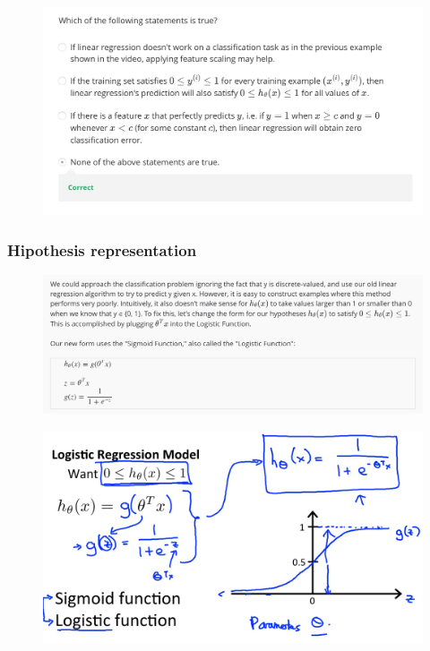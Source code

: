 \documentclass[12pt, A4,onecolumn]{article} %
\begin{document}
\begin{figure}[H]
	\centering
	\includegraphics[width=1\textwidth]{./Imagenes/testClass}
\end{figure}
\newpage
\subsubsection{Hipothesis representation}
\begin{figure}[H]
	\centering
	\includegraphics[width=1\textwidth]{./Imagenes/hipoRep1}
\end{figure}

\begin{figure}[H]
	\centering
	\includegraphics[width=1\textwidth]{./Imagenes/class3}
\end{figure}
\end{document}
